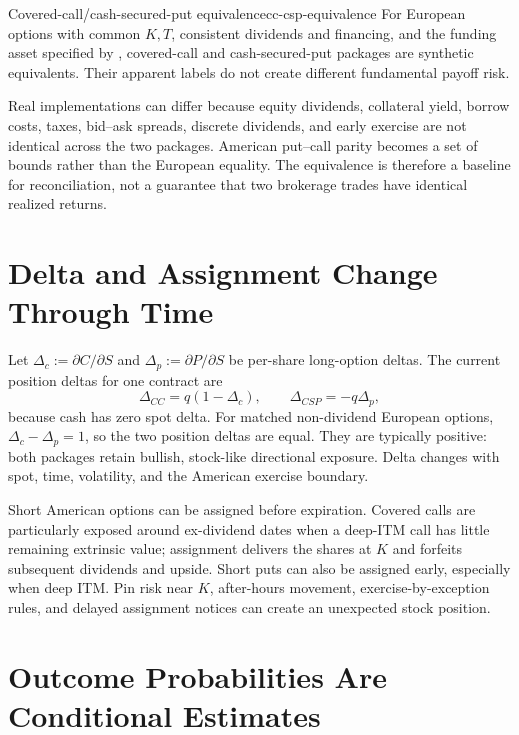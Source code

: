 \documentclass[11pt]{article}
\begin{document}
\begin{theorem}{Covered-call/cash-secured-put equivalence}{cc-csp-equivalence}
For European options with common $K,T$, consistent dividends and financing, and the funding asset specified by , covered-call and cash-secured-put packages are synthetic equivalents. Their apparent labels do not create different fundamental payoff risk.
\end{theorem}

Real implementations can differ because equity dividends, collateral yield, borrow costs, taxes, bid--ask spreads, discrete dividends, and early exercise are not identical across the two packages. American put--call parity becomes a set of bounds rather than the European equality. The equivalence is therefore a baseline for reconciliation, not a guarantee that two brokerage trades have identical realized returns.

\section{Delta and Assignment Change Through Time}

Let $\Delta_c:=\partial C/\partial S$ and $\Delta_p:=\partial P/\partial S$ be per-share long-option deltas. The current position deltas for one contract are
\begin{equation}
  \label{eq:position-deltas}
  \Delta_{CC}=q(1-\Delta_c),
  \qquad
  \Delta_{CSP}=-q\Delta_p,
\end{equation}
because cash has zero spot delta. For matched non-dividend European options, $\Delta_c-\Delta_p=1$, so the two position deltas are equal. They are typically positive: both packages retain bullish, stock-like directional exposure. Delta changes with spot, time, volatility, and the American exercise boundary.

Short American options can be assigned before expiration. Covered calls are particularly exposed around ex-dividend dates when a deep-ITM call has little remaining extrinsic value; assignment delivers the shares at $K$ and forfeits subsequent dividends and upside. Short puts can also be assigned early, especially when deep ITM. Pin risk near $K$, after-hours movement, exercise-by-exception rules, and delayed assignment notices can create an unexpected stock position.

\section{Outcome Probabilities Are Conditional Estimates}
\end{document}
